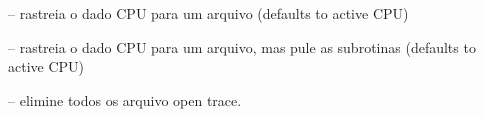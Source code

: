 \documentclass[letterpaper,10pt,brazil]{sphinxmanual}
\begin{document}
\begin{DUlineblock}{0em}
\item[] {\hyperref[debugger/execution:debugger\string-command\string-trace]{}} -- rastreia o dado CPU para um arquivo (defaults to active CPU)
\item[] {\hyperref[debugger/execution:debugger\string-command\string-traceover]{}} -- rastreia o dado CPU para um arquivo, mas pule as subrotinas (defaults to active CPU)
\item[] {\hyperref[debugger/execution:debugger\string-command\string-traceflush]{}} -- elimine todos os arquivo open trace.
\end{DUlineblock}
\begin{quote}
\label{debugger/execution:debugger-command-step}\end{quote}
\end{document}
